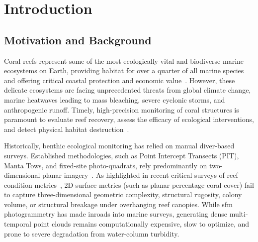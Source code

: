 
\chapter{Introduction}
\label{chap:introduction}

\section{Motivation and Background}
\label{sec:motivation}
Coral reefs represent some of the most ecologically vital and biodiverse marine ecosystems on Earth, providing habitat for over a quarter of all marine species and offering critical coastal protection and economic value~\cite{souter2020status}. However, these delicate ecosystems are facing unprecedented threats from global climate change, marine heatwaves leading to mass bleaching, severe cyclonic storms, and anthropogenic runoff. Timely, high-precision monitoring of coral structures is paramount to evaluate reef recovery, assess the efficacy of ecological interventions, and detect physical habitat destruction~\cite{icri2021monitoring}.

Historically, benthic ecological monitoring has relied on manual diver-based surveys. Established methodologies, such as Point Intercept Transects (PIT), Manta Tows, and fixed-site photo-quadrats, rely predominantly on two-dimensional planar imagery~\cite{icri2021monitoring}. As highlighted in recent critical surveys of reef condition metrics~\cite{davey2025review}, 2D surface metrics (such as planar percentage coral cover) fail to capture three-dimensional geometric complexity, structural rugosity, colony volume, or structural breakage under overhanging reef canopies. While \gls{sfm} photogrammetry has made inroads into marine surveys, generating dense multi-temporal point clouds remains computationally expensive, slow to optimize, and prone to severe degradation from water-column turbidity.

